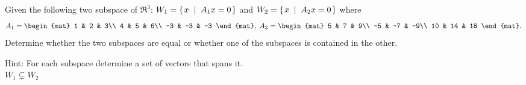 
\begin{Exercise}[
name={},
title={}, 
difficulty=0,
origin={\cite{YL}}]
Given the following two subspace of $\Re^3$: $W_1=\mbox{$\left\{\hspace{0.1em}x\;\;\middle|\;\; A_1x=0\hspace{0.1em}\right\}$}$ and $W_2=\mbox{$\left\{\hspace{0.1em}x\;\;\middle|\;\; A_2x=0\hspace{0.1em}\right\}$}$
where 
\[
A_1 = 
\begin{mat}
1 & 2 & 3\\
4 & 5 & 6\\
-3 & -3 & -3
\end{mat},\;
A_2 = 
\begin{mat}
5 & 7 & 9\\
-5 & -7 & -9\\
10 & 14 & 18
\end{mat}.
\]
Determine whether the two subspaces are equal or whether one of the subspaces is contained in the other.  


\end{Exercise}

\begin{Answer}
Hint: For each subspace determine a set of vectors that spans it.\\
$W_1\subsetneq W_2$
\end{Answer}
